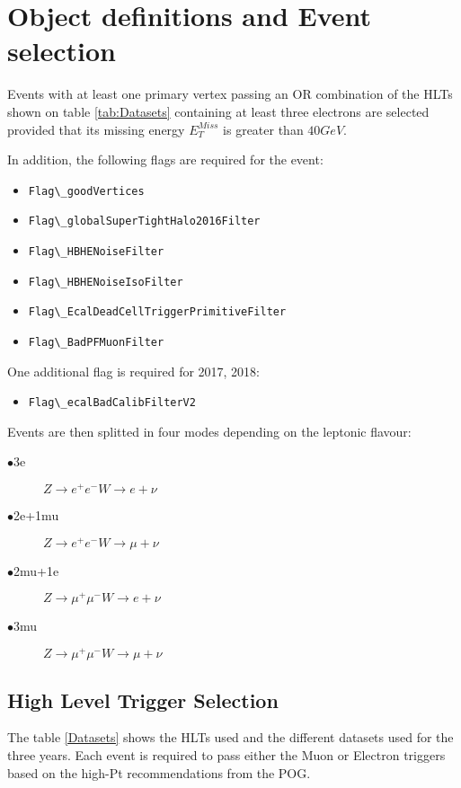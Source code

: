 \section{Object definitions and Event selection}

Events with at least one primary vertex passing an OR combination
of the HLTs shown on table \ref{tab:Datasets} containing at least three
electrons are selected provided that its missing energy $E_T^{Miss}$ is
greater than $40GeV$.

In addition, the following flags are required for the event:

\begin{itemize}
  \item \verb|Flag\_goodVertices|
  \item \verb|Flag\_globalSuperTightHalo2016Filter|
  \item \verb|Flag\_HBHENoiseFilter|
  \item \verb|Flag\_HBHENoiseIsoFilter|
  \item \verb|Flag\_EcalDeadCellTriggerPrimitiveFilter|
  \item \verb|Flag\_BadPFMuonFilter|
\end{itemize}

One additional flag is required for 2017, 2018:

\begin{itemize}
\item \verb|Flag\_ecalBadCalibFilterV2|
\end{itemize}

Events are then splitted in four modes depending on the leptonic flavour:

\begin{description}
\item[$\bullet$3e] $Z\rightarrow e^{+}e^{-} W\rightarrow e+\nu$
\item[$\bullet$2e+1mu] $Z\rightarrow e^{+}e^{-} W\rightarrow \mu+\nu$
\item[$\bullet$2mu+1e] $Z\rightarrow \mu^{+}\mu^{-} W\rightarrow e+\nu$
\item[$\bullet$3mu] $Z\rightarrow \mu^{+}\mu^{-} W\rightarrow \mu+\nu$
\end{description}


\subsection{High Level Trigger Selection}

The table \ref{Datasets} shows the HLTs used and the different datasets used for the three years.
Each event is required to pass either the Muon or Electron triggers based on the high-Pt
recommendations from the POG.


